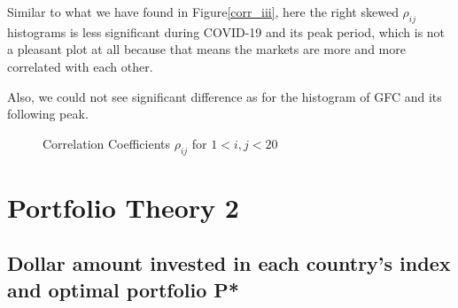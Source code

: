\documentclass[
]{article}
\begin{document}
Similar to what we have found in Figure\ref{corr_iii}, here the right
skewed \(\rho_{ij}\) histograms is less significant during COVID-19 and
its peak period, which is not a pleasant plot at all because that means
the markets are more and more correlated with each other.

Also, we could not see significant difference as for the histogram of
GFC and its following peak.

\begin{figure}
\centering
{}\hspace{5pt}
\hspace{5pt}
\caption{Correlation Coefficients $\rho_{ij}$ for $1 <i, j < 20$} \label{histo_iv}
\end{figure}

\hypertarget{portfolio-theory-2}{%
\section{Portfolio Theory 2}\label{portfolio-theory-2}}

\hypertarget{dollar-amount-invested-in-each-countrys-index-and-optimal-portfolio-p}{%
\subsection{Dollar amount invested in each country's index and optimal
portfolio
P*}\label{dollar-amount-invested-in-each-countrys-index-and-optimal-portfolio-p}}
\end{document}
